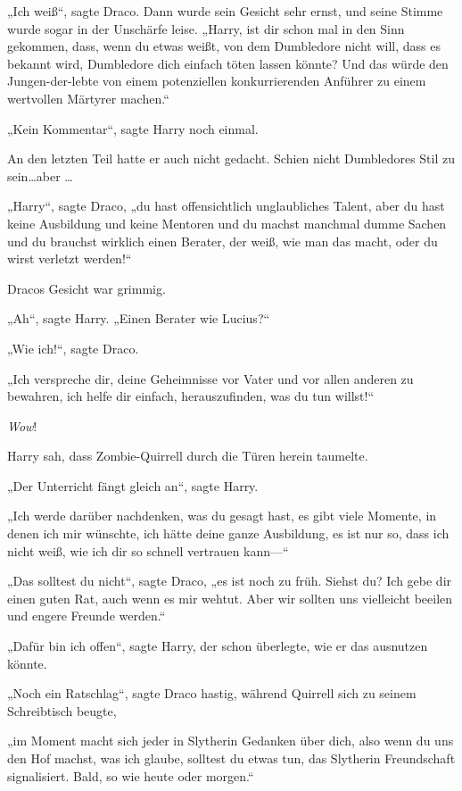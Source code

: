 {„Ich weiß“, sagte Draco. Dann wurde sein Gesicht sehr ernst, und seine Stimme wurde sogar in der Unschärfe leise. „Harry, ist dir schon mal in den Sinn gekommen, dass, wenn du etwas weißt, von dem Dumbledore nicht will, dass es bekannt wird, Dumbledore dich einfach töten lassen könnte? Und das würde den Jungen-der-lebte von einem potenziellen konkurrierenden Anführer zu einem wertvollen Märtyrer machen.“

„Kein Kommentar“, sagte Harry noch einmal.

An den letzten Teil hatte er auch nicht gedacht. Schien nicht Dumbledores Stil zu sein…aber …

„Harry“, sagte Draco, „du hast offensichtlich unglaubliches Talent, aber du hast keine Ausbildung und keine Mentoren und du machst manchmal dumme Sachen und du brauchst wirklich einen Berater, der weiß, wie man das macht, oder du wirst verletzt werden!“

Dracos Gesicht war grimmig.

„Ah“, sagte Harry. „Einen Berater wie Lucius?“

„Wie ich!“, sagte Draco.

„Ich verspreche dir, deine Geheimnisse vor Vater und vor allen anderen zu bewahren, ich helfe dir einfach, herauszufinden, was du tun willst!“

\emph{Wow}!

Harry sah, dass Zombie-Quirrell durch die Türen herein taumelte.

„Der Unterricht fängt gleich an“, sagte Harry.

„Ich werde darüber nachdenken, was du gesagt hast, es gibt viele Momente, in denen ich mir wünschte, ich hätte deine ganze Ausbildung, es ist nur so, dass ich nicht weiß, wie ich dir so schnell vertrauen kann—“

„Das solltest du nicht“, sagte Draco, „es ist noch zu früh. Siehst du? Ich gebe dir einen guten Rat, auch wenn es mir wehtut. Aber wir sollten uns vielleicht beeilen und engere Freunde werden.“

„Dafür bin ich offen“, sagte Harry, der schon überlegte, wie er das ausnutzen könnte.

„Noch ein Ratschlag“, sagte Draco hastig, während Quirrell sich zu seinem Schreibtisch beugte,

„im Moment macht sich jeder in Slytherin Gedanken über dich, also wenn du uns den Hof machst, was ich glaube, solltest du etwas tun, das Slytherin Freundschaft signalisiert. Bald, so wie heute oder morgen.“

}
